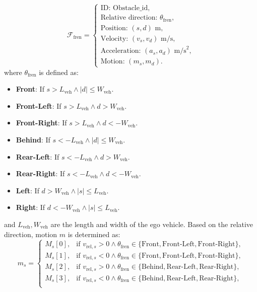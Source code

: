\begin{itemize}
{\small\[
    \mathcal{F}_{\text{fren}} =
    \begin{cases}
    \text{ID: } \text{Obstacle\_id}, \\
    \text{Relative direction: } \theta_{\text{fren}},\\
    \text{Position: } (s, d) \text{ m}, \\
    \text{Velocity: } (v_s, v_d) \text{ m/s}, \\
    \text{Acceleration: } (a_s, a_d) \text{ m/s}^2, \\
    \text{Motion: } (m_s, m_d).    
    \end{cases}
\]}
where \( \theta_{\text{fren}} \) is defined as:
{\scriptsize
\begin{itemize}
    \item \textbf{Front}:  If \( s > L_{\text{veh}} \land |d| \leq W_{\text{veh}} \).
    \item \textbf{Front-Left}: If \( s > L_{\text{veh}} \land d > W_{\text{veh}} \).
    \item \textbf{Front-Right}: If \( s > L_{\text{veh}} \land d < -W_{\text{veh}} \).
    \item \textbf{Behind}: If \( s < -L_{\text{veh}} \land |d| \leq W_{\text{veh}} \).
    \item \textbf{Rear-Left}: If \( s < -L_{\text{veh}} \land d > W_{\text{veh}} \).
    \item \textbf{Rear-Right}: If \( s < -L_{\text{veh}} \land d < -W_{\text{veh}} \).
    \item \textbf{Left}: If \( d > W_{\text{veh}} \land |s| \leq L_{\text{veh}} \).
    \item \textbf{Right}: If \( d < -W_{\text{veh}} \land |s| \leq L_{\text{veh}} \).
\end{itemize}
}
and \( L_{\text{veh}}, W_{\text{veh}} \) are the length and width of the ego vehicle. Based on the relative direction, motion \( m \) is determined as:
{\scriptsize
\[
    m_s =
    \begin{cases}
    M_s[0], & \text{if } v_{\text{rel}, s} > 0 \land \theta_{\text{fren}} \in \{\text{Front}, \text{Front-Left}, \text{Front-Right}\}, \\
    M_s[1], & \text{if } v_{\text{rel}, s} < 0 \land \theta_{\text{fren}} \in \{\text{Front}, \text{Front-Left}, \text{Front-Right}\}, \\
    M_s[2], & \text{if } v_{\text{rel}, s} > 0 \land \theta_{\text{fren}} \in \{\text{Behind}, \text{Rear-Left}, \text{Rear-Right}\}, \\
    M_s[3], & \text{if } v_{\text{rel}, s} < 0 \land \theta_{\text{fren}} \in \{\text{Behind}, \text{Rear-Left}, \text{Rear-Right}\}, \\

\end{cases}\]}
\end{itemize}
